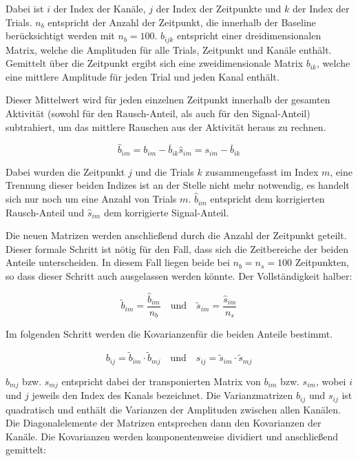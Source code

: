 \documentclass[doc,a4paper,12pt]{apa6}
\begin{document}
Dabei ist $i$ der Index der Kanäle, $j$ der Index der Zeitpunkte und $k$ der Index der Trials. $n_b$ entspricht der Anzahl der Zeitpunkt, die innerhalb der Baseline berücksichtigt werden mit $n_b = 100$. $b_{ijk}$ entspricht einer dreidimensionalen Matrix, welche die Amplituden für alle Trials, Zeitpunkt und Kanäle enthält. Gemittelt über die Zeitpunkt ergibt sich eine zweidimensionale Matrix $b_{ik}$, welche eine mittlere Amplitude für jeden Trial und jeden Kanal enthält.

Dieser Mittelwert wird für jeden einzelnen Zeitpunkt innerhalb der gesamten Aktivität (sowohl für den Rausch-Anteil, als auch für den Signal-Anteil) subtrahiert, um das mittlere Rauschen aus der Aktivität heraus zu rechnen.

\begin{equation}
\hat{b}_{im} = b_{im} - \bar{b}_{ik}
\hat{s}_{im} = s_{im} - \bar{b}_{ik}
\end{equation}

Dabei wurden die Zeitpunkt $j$ und die Trials $k$ zusammengefasst im Index $m$, eine Trennung dieser beiden Indizes ist an der Stelle nicht mehr notwendig, es handelt sich nur noch um eine Anzahl von Trials $m$. $\hat{b}_{im}$ entspricht dem korrigierten Rausch-Anteil und $\hat{s}_{im}$ dem korrigierte Signal-Anteil.

Die neuen Matrizen werden anschließend durch die Anzahl der Zeitpunkt geteilt. Dieser formale Schritt ist nötig für den Fall, dass sich die Zeitbereiche der beiden Anteile unterscheiden. In diesem Fall liegen beide bei $n_b = n_s = 100$ Zeitpunkten, so dass dieser Schritt auch ausgelassen werden könnte. Der Vollständigkeit halber:

\begin{equation}
\tilde{b}_{im} = \frac{\hat{b}_{im}}{n_b} \quad \text{und} \quad \tilde{s}_{im} = \frac{\hat{s}_{im}}{n_s}
\end{equation}

Im folgenden Schritt werden die Kovarianzenfür die beiden Anteile bestimmt.

\begin{equation}
b_{ij} = \tilde{b}_{im} \cdot \tilde{b}_{mj} \quad \text{und} \quad s_{ij} = \tilde{s}_{im} \cdot \tilde{s}_{mj}
\end{equation}

$b_{mj}$ bzw. $s_{mj}$ entspricht dabei der transponierten Matrix von $b_{im}$ bzw. $s_{im}$, wobei $i$ und $j$ jeweils den Index des Kanals bezeichnet. Die Varianzmatrizen $b_{ij}$ und $s_{ij}$ ist quadratisch und enthält die Varianzen der Amplituden zwischen allen Kanälen. Die Diagonalelemente der Matrizen entsprechen dann den Kovarianzen der Kanäle. Die Kovarianzen werden komponentenweise dividiert und anschließend gemittelt:
\end{document}
